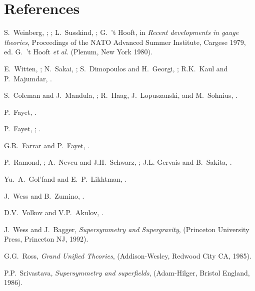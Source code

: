 \section*{References}

\begin{thebibliography}{99}

 S.~Weinberg, ;
;
L.~Susskind, ;
G.~'t Hooft, in {\it Recent developments in gauge theories},
Proceedings of the NATO Advanced Summer Institute, Cargese 1979,
ed. G.~'t Hooft {\it et al.} (Plenum, New York 1980).

 E.~Witten, ;
N.~Sakai, ;
S.~Dimopoulos and H.~Georgi, ;
R.K.~Kaul and P.~Majumdar, .

 S.~Coleman and J.~Mandula, ;
R.~Haag, J.~Lopuszanski, and M.~Sohnius, .

 P.~Fayet,
.

 P.~Fayet,
;
.

 G.R.~Farrar and P.~Fayet,
.

 P.~Ramond, ;
A.~Neveu and J.H.~Schwarz, ;
J.L. Gervais and B.~Sakita, .

 Yu.~A.~Gol'fand and E.~P.~Likhtman,
.

 J.~Wess and B.~Zumino,
.

 D.V.~Volkov and V.P.~Akulov,
.

 J.~Wess and J.~Bagger,
{\em Supersymmetry and Supergravity},
(Princeton University Press, Princeton NJ, 1992).

 G.G.~Ross, {\em Grand Unified Theories},
(Addison-Wesley, Redwood City CA, 1985).

 P.P.~Srivastava, {\em Supersymmetry and
superfields}, (Adam-Hilger, Bristol England, 1986).


\end{thebibliography}
